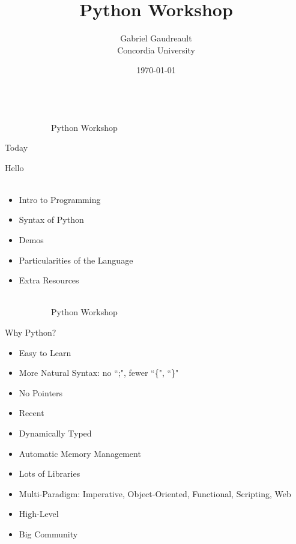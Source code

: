 \documentclass[10pt, xcolor=dvisnames]{beamer}
\title{Python Workshop}
\author{Gabriel Gaudreault\\ Concordia University}
\date{\small \today}
\begin{document}
\maketitle




\begin{frame}{{\tiny \ \\\vspace{-13pt} \ \ \ \ \ \ \ \ \ \ \ Python Workshop}\\ \centerline{Today}}
\vspace*{-50pt}

Hello\\
\ \\

\begin{itemize}
\item Intro to Programming
\item Syntax of Python
\item Demos
\item Particularities of the Language
\item Extra Resources
\end{itemize}


\end{frame}







\begin{frame}{{\tiny \ \\\vspace{-13pt} \ \ \ \ \ \ \ \ \ \ \ Python Workshop}\\ \centerline{Why Python?}}
\vspace*{-50pt}

\begin{itemize}
\item Easy to Learn
\item More Natural Syntax: no ``;", fewer ``\{", ``\}"
\item No Pointers
\item Recent
\item Dynamically Typed
\item Automatic Memory Management
\item Lots of Libraries
\item Multi-Paradigm: Imperative, Object-Oriented, Functional, Scripting, Web
\item High-Level
\item Big Community
\end{itemize}


\end{frame}
\end{document}

